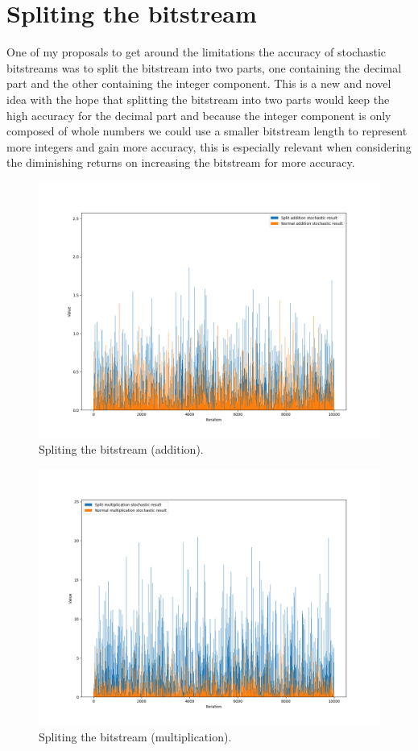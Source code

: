 \documentclass[a4paper,oneside,phd,etd]{BYUPhys}
\begin{document}
\section{Spliting the bitstream}
One of my proposals to get around the limitations the accuracy of stochastic bitstreams was to split the bitstream into two parts, one containing the decimal part and the other containing the integer component. This is a new and novel idea with the hope that splitting the bitstream into two parts would keep the high accuracy for the decimal part and because the integer component is only composed of whole numbers we could use a smaller bitstream length to represent more integers and gain more accuracy, this is especially relevant when considering the diminishing returns on increasing the bitstream for more accuracy.
\begin{figure}[H]
\centering
\includegraphics[scale=0.40]{results/split-add.png}
\caption{Spliting the bitstream (addition).}
\label{fig:spliting}
\end{figure}
\begin{figure}[H]
\centering
\includegraphics[scale=0.40]{results/split-mult.png}
\caption{Spliting the bitstream (multiplication).}
\label{fig:spliting}
\end{figure}
\end{document}
